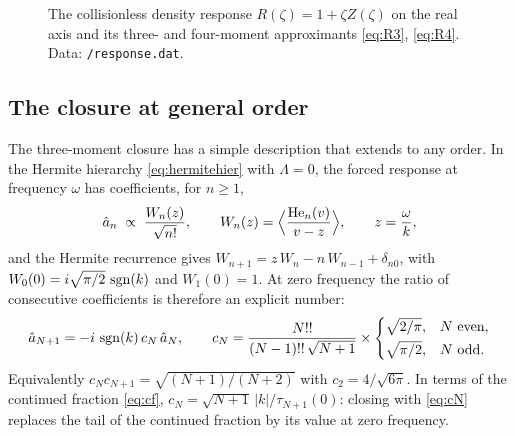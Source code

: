 \begin{figure}[ht]
\centering
{}\hfill
{}
\caption{The collisionless density response $R(\zeta)=1+\zeta Z(\zeta)$ on
the real axis and its three- and four-moment approximants \eqref{eq:R3},
\eqref{eq:R4}. Data: \texttt{\rundir/response.dat}.}
\label{fig:response}
\end{figure}

\subsection{The closure at general order}
\label{sec:general-order}

The three-moment closure has a simple description that extends to any
order. In the Hermite hierarchy \eqref{eq:hermitehier} with $\Lambda=0$,
the forced response at frequency $\omega$ has coefficients, for $n\ge1$,
\[
  \hat a_n\;\propto\;\frac{W_n(z)}{\sqrt{n!}},\qquad
  W_n(z)=\Bigl\langle\frac{\mathrm{He}_n(v)}{v-z}\Bigr\rangle,\qquad
  z=\frac{\omega}{k},
\]
and the Hermite recurrence gives
$W_{n+1}=z\,W_n-n\,W_{n-1}+\delta_{n0}$, with
$W_0(0)=i\sqrt{\pi/2}\,\operatorname{sgn}(k)$ and $W_1(0)=1$. At zero frequency the
ratio of consecutive coefficients is therefore an explicit number:
\begin{equation}
  \hat a_{N+1}=-i\,\operatorname{sgn}(k)\,c_N\,\hat a_N,
  \qquad
  c_N=\frac{N!!}{(N-1)!!\,\sqrt{N+1}}\times
  \begin{cases}\sqrt{2/\pi},&N\text{ even},\\[2pt]
               \sqrt{\pi/2},&N\text{ odd}.\end{cases}
  \label{eq:cN}
\end{equation}
Equivalently $c_Nc_{N+1}=\sqrt{(N+1)/(N+2)}$ with
$c_2=4/\sqrt{6\pi}$. In terms of the continued fraction \eqref{eq:cf},
$c_N=\sqrt{N+1}\,|k|/\tau_{N+1}(0)$: closing with \eqref{eq:cN} replaces
the tail of the continued fraction by its value at zero frequency.

